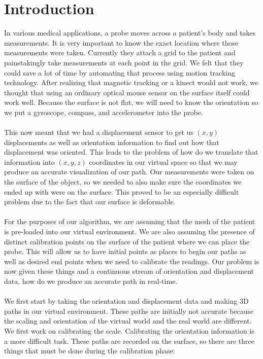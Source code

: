 \section{Introduction}

In various medical applications, a probe moves across a patient's body and takes measurements. It is very important to know the exact location where those measurements were taken. Currently they attach a grid to the patient and painstakingly take measurements at each point in the grid. We felt that they could save a lot of time by automating that process using motion tracking technology. After realizing that magnetic tracking or a kinect would not work, we thought that using an ordinary optical mouse sensor on the surface itself could work well. Because the surface is not flat, we will need to know the orientation so we put a gyroscope, compass, and accelerometer into the probe. \\
\\
This now meant that we had a displacement sensor to get us $(x,y)$ displacements as well as orientation information to find out how that displacement was oriented. This leads to the problem of how do we translate that information into $(x,y,z)$ coordinates in our virtual space so that we may produce an accurate visualization of our path. Our measurements were taken on the surface of the object, so we needed to also make sure the coordinates we ended up with were on the surface. This proved to be an especially difficult problem due to the fact that our surface is deformable. \\
\\
For the purposes of our algorithm, we are assuming that the mesh of the patient is pre-loaded into our virtual environment. We are also assuming the presence of distinct calibration points on the surface of the patient where we can place the probe. This will allow us to have initial points as places to begin our paths as well as desired end points when we need to calibrate the readings. Our problem is now given these things and a continuous stream of orientation and displacement data, how do we produce an accurate path in real-time.\\
\\
We first start by taking the orientation and displacement data and making 3D paths in our virtual environment. These paths are initially not accurate because the scaling and orientation of the virtual world and the real world are different. We first work on calibrating the scale. Calibrating the orientation information is a more difficult task. These paths are recorded on the surface, so there are three things that must be done during the calibration phase: \\
